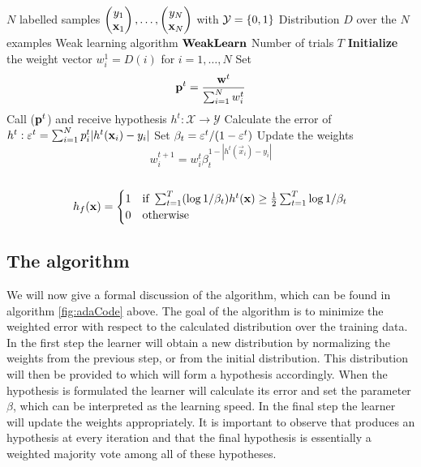 \begin{algorithm} 
\caption{\adaB}
\label{fig:adaCode}
	\begin{algorithmic}[1]
	\Require 
	\Statex $N$ labelled samples $\Vec{y_1\\ \mathbf x_1},\ldots,\Vec{y_N\\ \mathbf x_N}$  with $\mathcal Y = \set{0,1}$ 
	\Statex Distribution $D$ over the $N$ examples
	\Statex Weak learning algorithm $\weak$
	\Statex Number of trials $T$
	\State \textbf{Initialize} the weight vector $w_i^1=D(i)$ for $i=1,\ldots,N$
	\State Set $$\bf p^t= \frac{\bf w^t}{\sum_{i=1}^N w^t_i}$$
	\State Call \weak($\bf p^t$) and receive hypothesis $h^t:\mathcal X\to\mathcal Y$
	\State Calculate the error of $h^t:\ve^t=\sum^N_{i=1}p^t_i|h^t(\mathbf x_i)-y_i|$\label{algStep:adaErr}
	\State Set $\b_t=\ve^t/(1-\ve^t)$
	\State Update the weights $$w_i^{t+1}=w_i^t\beta^{1-|h^t(\vec x_i)-y_i|}_t$$
	\EndFor\\
	\Return $$h_f(\mathbf x)=\begin{cases}1 & \text{if } \sum^T_{t=1}(\log1/\b_t)h^t(\mathbf x)\geq\frac12\sum^T_{t=1}\log1/\b_t\\0&\text{otherwise}\end{cases}$$
	\EndProcedure
	\end{algorithmic}
\end{algorithm}
\vspace{-5pt}
\subsection{The algorithm}
\label{subsec:AdaAlgo}
We will now give a formal discussion of the \adaB\cite{Freund1997} algorithm, which can be found in algorithm \ref{fig:adaCode} above. The goal of the algorithm is to minimize the weighted error with respect to the calculated distribution 
over the training data. In the first step the learner will obtain a new distribution by normalizing the weights from the previous step, or from the initial distribution. This distribution will then be provided to \weak which will form a hypothesis accordingly. When the hypothesis is formulated the learner will calculate its error and set the parameter $\beta$, which can be interpreted as the learning speed. In the final step the learner will update the weights appropriately. It is important to observe that \weak produces an hypothesis at every iteration and that the final hypothesis is essentially a weighted majority vote among all of these hypotheses. \par

